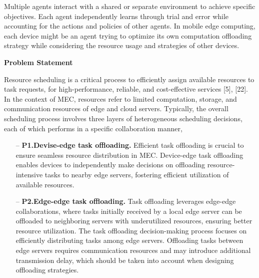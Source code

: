 \documentclass[12pt]{article}
\begin{document}
 Multiple agents interact with a shared or separate environment to achieve specific objectives. Each agent independently learns through trial and error while accounting for the actions and policies of other agents. In mobile edge computing, each device might be an agent trying to optimize its own computation offloading strategy while considering the resource usage and strategies of other devices.


\vspace{4mm}

\noindent\textbf{\large Problem Statement}

\noindent Resource scheduling is a critical process to efficiently assign available resources to task requests, for high-performance, reliable, and cost-effective services [5], [22]. In the context of MEC, resources refer to limited computation, storage, and communication resources of edge and cloud servers. Typically, the overall scheduling process involves three layers of heterogeneous scheduling decisions, each of which performs in a specific collaboration manner,


	


\begin{itemize}
	\item[--]\textbf{P1.\hspace{2mm}Devise-edge task offloading.}
	Efficient task offloading is crucial to ensure seamless resource distribution in MEC. Device-edge task offloading enables devices to independently make decisions on offloading resource-intensive tasks to nearby edge servers, fostering efficient utilization of available resources.
	
	\item[--]\textbf{P2.\hspace{2mm}Edge-edge task offloading.} 
	Task offloading leverages edge-edge collaborations, where tasks initially received by a local edge server can be offloaded to neighboring servers with underutilized resources, ensuring better resource utilization. The task offloading decision-making process focuses on efficiently distributing tasks among edge servers. Offloading tasks between edge servers requires communication resources and may introduce additional transmission delay, which should be taken into account when designing offloading strategies.
\end{itemize}
\end{document}
